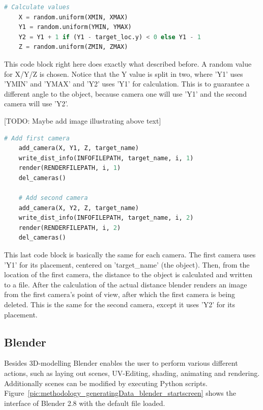 \begin{lstlisting}[language=python]
	# Calculate values
    X = random.uniform(XMIN, XMAX)
    Y1 = random.uniform(YMIN, YMAX)
    Y2 = Y1 + 1 if (Y1 - target_loc.y) < 0 else Y1 - 1
    Z = random.uniform(ZMIN, ZMAX)
\end{lstlisting}

This code block right here does exactly what described before. A random value for X/Y/Z is chosen. Notice that the Y value is split in two, where 'Y1' uses 'YMIN' and 'YMAX' and 'Y2' uses 'Y1' for calculation. This is to guarantee a different angle to the object, because camera one will use 'Y1' and the second camera will use 'Y2'.

[TODO: Maybe add image illustrating above text]

\begin{lstlisting}[language=python]
	# Add first camera
    add_camera(X, Y1, Z, target_name)
    write_dist_info(INFOFILEPATH, target_name, i, 1)
    render(RENDERFILEPATH, i, 1)
    del_cameras()
        
    # Add second camera
    add_camera(X, Y2, Z, target_name)
    write_dist_info(INFOFILEPATH, target_name, i, 2)
    render(RENDERFILEPATH, i, 2)
    del_cameras()
\end{lstlisting}

This last code block is basically the same for each camera. The first camera uses 'Y1' for its placement, centered on 'target\_name' (the object). Then, from the location of the first camera, the distance to the object is calculated and written to a file. After the calculation of the actual distance blender renders an image from the first camera's point of view, after which the first camera is being deleted. This is the same for the second camera, except it uses 'Y2' for its placement.

\subsection{Blender}
Besides 3D-modelling Blender enables the user to perform various different actions, such as laying out scenes, UV-Editing, shading, animating and rendering. Additionally scenes can be modified by executing Python scripts. Figure~\ref{pic:methodology_generatingData_blender_startscreen} shows the interface of Blender 2.8 with the default file loaded.

